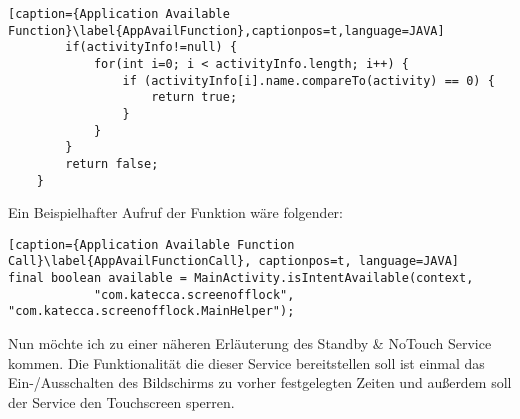 \begin{flushleft}
\begin{lstlisting}[caption={Application Available Function}\label{AppAvailFunction},captionpos=t,language=JAVA]
		if(activityInfo!=null) {
            for(int i=0; i < activityInfo.length; i++) {
            	if (activityInfo[i].name.compareTo(activity) == 0) {
            		return true;
            	}
            }
        }
		return false;
	}
\end{lstlisting}

Ein Beispielhafter Aufruf der Funktion wäre folgender:

\begin{lstlisting}[caption={Application Available Function Call}\label{AppAvailFunctionCall}, captionpos=t, language=JAVA] 
final boolean available = MainActivity.isIntentAvailable(context,
			"com.katecca.screenofflock", "com.katecca.screenofflock.MainHelper");
\end{lstlisting}

Nun möchte ich zu einer näheren Erläuterung des Standby \& NoTouch Service kommen. Die Funktionalität die dieser Service bereitstellen soll ist einmal das Ein-/Ausschalten des Bildschirms zu vorher festgelegten Zeiten und außerdem soll der Service den Touchscreen sperren.

\end{flushleft}
